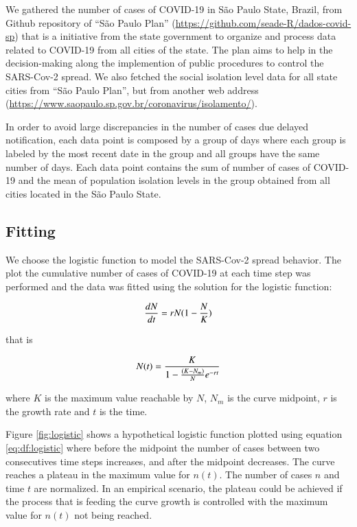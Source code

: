 \documentclass[review]{elsarticle}
\begin{document}
We gathered the number of cases of \hbox{COVID-19}
in S\~{a}o Paulo State, Brazil, 
from Github repository of ``S\~{a}o Paulo Plan'' 
(\url{https://github.com/seade-R/dados-covid-sp}) 
that is a initiative from the state government 
to organize and process data related to COVID-19 
from all cities of the state. 
The plan aims to help in the decision-making 
along the implemention of public 
procedures to control the \hbox{SARS-Cov-2} spread. 
We also fetched the social isolation level data 
for all state cities  from 
``S\~{a}o Paulo Plan'', but from another web address 
(\url{https://www.saopaulo.sp.gov.br/coronavirus/isolamento/}).

In order to avoid large discrepancies 
in the number of cases due delayed notification, 
 each data point is composed by a group of days 
 where each group is labeled by the most 
 recent date in the group and 
 all groups have the same number of days. 
 Each data point contains the sum of number 
 of cases of \hbox{COVID-19} and 
 the mean of population isolation levels 
 in the group obtained from all cities 
 located in the S\~{a}o Paulo State.

\subsection{Fitting}

We choose the logistic function to model 
the \hbox{SARS-Cov-2} spread behavior. 
The plot the cumulative number of cases of \hbox{COVID-19}
at each time step was performed and 
the data was fitted using the solution for the logistic function:

\begin{equation}
{dN \over dt} = r N (1 - {N \over K})
\label{eq:df:logistic}
\end{equation}

\noindent that is

\begin{equation}
N(t) = {K \over {1- {(K-N_{m}) \over N} e^{-rt}}}
\label{eq:exp:logistic}
\end{equation}

\noindent where $K$ is the maximum value reachable by $N$, 
$N_m$ is the curve midpoint, 
$r$ is the growth rate 
and $t$ is the time.

Figure \ref{fig:logistic} shows a hypothetical logistic function 
plotted using equation \ref{eq:df:logistic} where before the midpoint 
the number of cases between 
two consecutives time steps increases, 
and after the midpoint decreases. 
The curve reaches a plateau in the maximum value for $n(t)$. 
The number of cases $n$ and time $t$ are normalized.
In an empirical scenario, the plateau could be achieved 
if the process that is feeding the curve 
growth is controlled with the maximum 
value for $n(t)$ not being reached.
\end{document}

